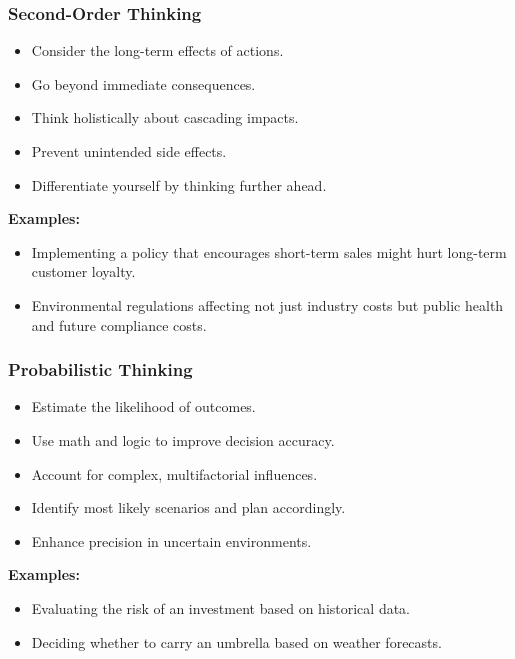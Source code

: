\begin{frame}[fragile]\frametitle{Second-Order Thinking}
\begin{itemize}
    \item Consider the long-term effects of actions.
    \item Go beyond immediate consequences.
    \item Think holistically about cascading impacts.
    \item Prevent unintended side effects.
    \item Differentiate yourself by thinking further ahead.
\end{itemize}
\textbf{Examples:}
\begin{itemize}
    \item Implementing a policy that encourages short-term sales might hurt long-term customer loyalty.
    \item Environmental regulations affecting not just industry costs but public health and future compliance costs.
\end{itemize}
\end{frame}

\begin{frame}[fragile]\frametitle{Probabilistic Thinking}
\begin{itemize}
    \item Estimate the likelihood of outcomes.
    \item Use math and logic to improve decision accuracy.
    \item Account for complex, multifactorial influences.
    \item Identify most likely scenarios and plan accordingly.
    \item Enhance precision in uncertain environments.
\end{itemize}
\textbf{Examples:}
\begin{itemize}
    \item Evaluating the risk of an investment based on historical data.
    \item Deciding whether to carry an umbrella based on weather forecasts.
\end{itemize}
\end{frame}

